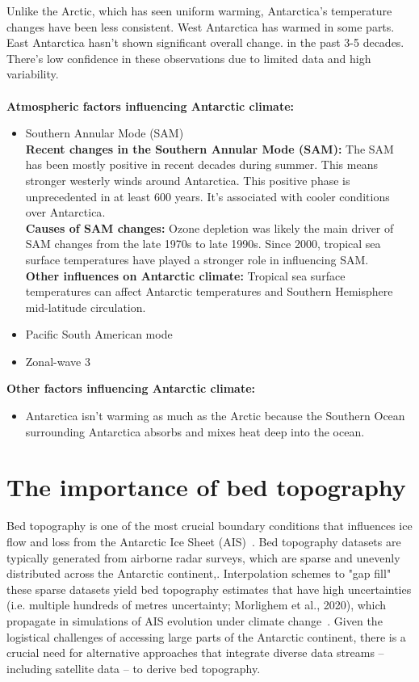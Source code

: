 Unlike the Arctic, which has seen uniform warming, Antarctica's temperature changes have been less consistent. West Antarctica has warmed in some parts. East Antarctica hasn't shown significant overall change. in the past 3-5 decades. There's low confidence in these observations due to limited data and high variability\cite{O_C_in_changingClimate}. \\\\
\textbf{Atmospheric factors influencing Antarctic climate:}
\begin{itemize}
\item Southern Annular Mode (SAM)\\
    \textbf{Recent changes in the Southern Annular Mode (SAM):} The SAM has been mostly positive in recent decades during summer. This means stronger westerly winds around Antarctica. This positive phase is unprecedented in at least 600 years. It's associated with cooler conditions over Antarctica\cite{O_C_in_changingClimate}.\\
    \textbf{Causes of SAM changes:} Ozone depletion was likely the main driver of SAM changes from the late 1970s to late 1990s. Since 2000, tropical sea surface temperatures have played a stronger role in influencing SAM\cite{O_C_in_changingClimate}.\\
    \textbf{Other influences on Antarctic climate:} Tropical sea surface temperatures can affect Antarctic temperatures and Southern Hemisphere mid-latitude circulation\cite{JACOBS_2004}.
\item Pacific South American mode
\item Zonal-wave 3
\end{itemize}

\textbf{Other factors influencing Antarctic climate:}
\begin{itemize}
\item Antarctica isn't warming as much as the Arctic because the Southern Ocean surrounding Antarctica absorbs and mixes heat deep into the ocean\cite{L_T_C_C}.
\end{itemize}

\section*{The importance of bed topography}
Bed topography is one of the most crucial boundary conditions that influences ice flow and loss from the Antarctic Ice Sheet (AIS)~\cite{DeepGlacialTroughs}. Bed topography datasets are typically generated from airborne radar surveys, which are sparse and unevenly distributed across the Antarctic continent,. Interpolation schemes to "gap fill" these sparse datasets yield bed topography estimates that have high uncertainties (i.e. multiple hundreds of metres uncertainty; Morlighem et al., 2020), which propagate in simulations of AIS evolution under climate change~\cite{ReductionOfUncertaintyThwaites}. Given the logistical challenges of accessing large parts of the Antarctic continent, there is a crucial need for alternative approaches that integrate diverse data streams – including satellite data – to derive bed topography.

